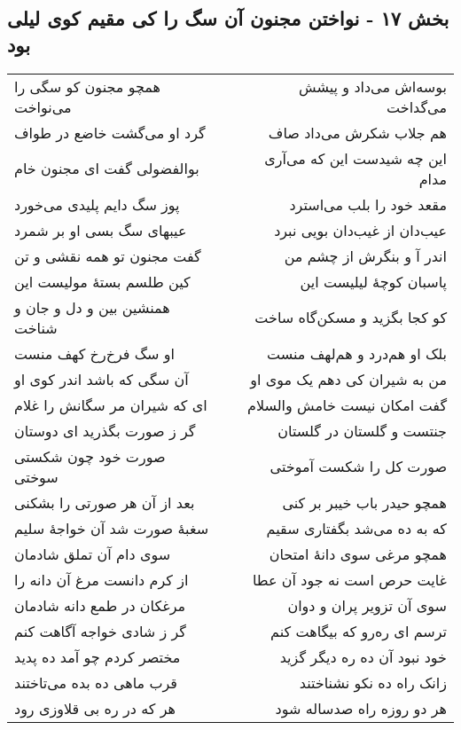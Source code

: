\begin{center}
\section*{بخش ۱۷ - نواختن مجنون آن سگ را کی مقیم  کوی لیلی بود}
\label{sec:sh017}
\begin{longtable}{l p{0.5cm} r}
همچو مجنون کو سگی را می‌نواخت
&&
بوسه‌اش می‌داد و پیشش می‌گداخت
\\
گرد او می‌گشت خاضع در طواف
&&
هم جلاب شکرش می‌داد صاف
\\
بوالفضولی گفت ای مجنون خام
&&
این چه شیدست این که می‌آری مدام
\\
پوز سگ دایم پلیدی می‌خورد
&&
مقعد خود را بلب می‌استرد
\\
عیبهای سگ بسی او بر شمرد
&&
عیب‌دان از غیب‌دان بویی نبرد
\\
گفت مجنون تو همه نقشی و تن
&&
اندر آ و بنگرش از چشم من
\\
کین طلسم بستهٔ مولیست این
&&
پاسبان کوچهٔ لیلیست این
\\
همنشین بین و دل و جان و شناخت
&&
کو کجا بگزید و مسکن‌گاه ساخت
\\
او سگ فرخ‌رخ کهف منست
&&
بلک او هم‌درد و هم‌لهف منست
\\
آن سگی که باشد اندر کوی او
&&
من به شیران کی دهم یک موی او
\\
ای که شیران مر سگانش را غلام
&&
گفت امکان نیست خامش والسلام
\\
گر ز صورت بگذرید ای دوستان
&&
جنتست و گلستان در گلستان
\\
صورت خود چون شکستی سوختی
&&
صورت کل را شکست آموختی
\\
بعد از آن هر صورتی را بشکنی
&&
همچو حیدر باب خیبر بر کنی
\\
سغبهٔ صورت شد آن خواجهٔ سلیم
&&
که به ده می‌شد بگفتاری سقیم
\\
سوی دام آن تملق شادمان
&&
همچو مرغی سوی دانهٔ امتحان
\\
از کرم دانست مرغ آن دانه را
&&
غایت حرص است نه جود آن عطا
\\
مرغکان در طمع دانه شادمان
&&
سوی آن تزویر پران و دوان
\\
گر ز شادی خواجه آگاهت کنم
&&
ترسم ای ره‌رو که بیگاهت کنم
\\
مختصر کردم چو آمد ده پدید
&&
خود نبود آن ده ره دیگر گزید
\\
قرب ماهی ده بده می‌تاختند
&&
زانک راه ده نکو نشناختند
\\
هر که در ره بی قلاوزی رود
&&
هر دو روزه راه صدساله شود
\\

\end{longtable}
\end{center}
